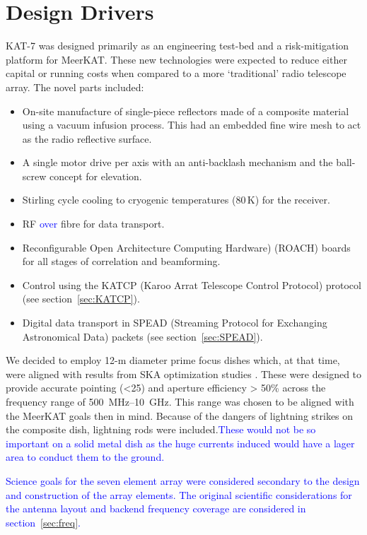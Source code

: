 \section{Design Drivers}
\label{sec:design}

\noindent
KAT-7 was designed primarily as an engineering test-bed and a
risk-mitigation platform for MeerKAT\@. These new technologies were
expected to reduce either capital or running costs when compared to a
more `traditional' radio telescope array. The novel parts included:


\begin{itemize}
\item On-site manufacture of single-piece reflectors made of a
  composite material using a vacuum infusion process. This had an
  embedded fine wire mesh to act as the radio reflective surface.
\item A single motor drive per axis with an anti-backlash mechanism
  and the ball-screw concept for elevation.
\item Stirling cycle cooling to cryogenic temperatures (80\,K) for the
  receiver.
\item RF \textcolor{blue}{over} fibre for data transport.
\item Reconfigurable Open Architecture Computing Hardware) (ROACH)
  boards for all stages of correlation and beamforming.
\item Control using the KATCP (Karoo Arrat Telescope Control Protocol)
 protocol (see section~\ref{sec:KATCP}).
\item Digital data transport in SPEAD (Streaming Protocol for
 Exchanging Astronomical Data) packets (see section~\ref{sec:SPEAD}).
\end{itemize}

We decided to employ 12-m diameter prime focus dishes which, at that time,
were aligned with results from SKA optimization studies
\citep{strawman}. These were designed to provide accurate
pointing (\textless 25\arcsec) and aperture efficiency \textgreater
50\% across the frequency range of 500~MHz--10~GHz. This range
was chosen to be aligned with the MeerKAT goals then in mind. Because
of the dangers of lightning strikes on the composite dish, lightning rods were
included.\textcolor{blue}{These would not be so important on a solid metal
dish as the huge currents induced would have a lager area to conduct them to the
ground.}

\textcolor{blue}{
Science goals for the seven element array were considered secondary to the
design and construction of the array elements. The original scientific 
considerations for the antenna layout and backend frequency coverage are 
considered in section~\ref{sec:freq}.}